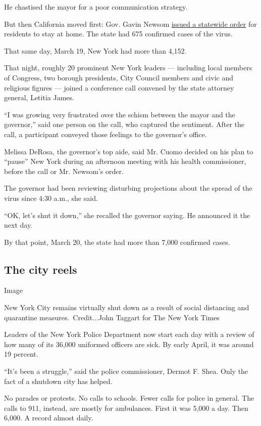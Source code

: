 He chastised the mayor for a poor communication strategy.

But then California moved first: Gov. Gavin Newsom
\href{https://www.nytimes3xbfgragh.onion/2020/03/19/us/California-stay-at-home-order-virus.html}{issued
a statewide order} for residents to stay at home. The state had 675
confirmed cases of the virus.

That same day, March 19, New York had more than 4,152.

That night, roughly 20 prominent New York leaders --- including local
members of Congress, two borough presidents, City Council members and
civic and religious figures --- joined a conference call convened by the
state attorney general, Letitia James.

``I was growing very frustrated over the schism between the mayor and
the governor,'' said one person on the call, who captured the sentiment.
After the call, a participant conveyed those feelings to the governor's
office.

Melissa DeRosa, the governor's top aide, said Mr. Cuomo decided on his
plan to ``pause'' New York during an afternoon meeting with his health
commissioner, before the call or Mr. Newsom's order.

The governor had been reviewing disturbing projections about the spread
of the virus since 4:30 a.m., she said.

``OK, let's shut it down,'' she recalled the governor saying. He
announced it the next day.

By that point, March 20, the state had more than 7,000 confirmed cases.

\hypertarget{the-city-reels}{%
\subsection{The city reels}\label{the-city-reels}}

Image

New York City remains virtually shut down as a result of social
distancing and quarantine measures.~Credit...John Taggart for The New
York Times

Leaders of the New York Police Department now start each day with a
review of how many of its 36,000 uniformed officers are sick. By early
April, it was around 19 percent.

``It's been a struggle,'' said the police commissioner, Dermot F. Shea.
Only the fact of a shutdown city has helped.

No parades or protests. No calls to schools. Fewer calls for police in
general. The calls to 911, instead, are mostly for ambulances. First it
was 5,000 a day. Then 6,000. A record almost daily.

